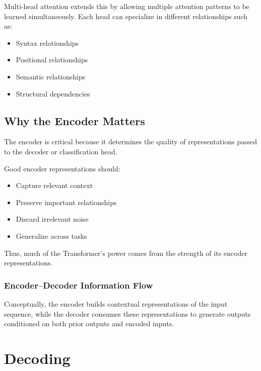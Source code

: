 \documentclass[11pt]{article}
\begin{document}
Multi-head attention extends this by allowing multiple attention patterns to be learned simultaneously. Each head can specialize in different relationships such as:

\begin{itemize}

\item Syntax relationships
\item Positional relationships
\item Semantic relationships
\item Structural dependencies

\end{itemize}

\subsection{Why the Encoder Matters}

The encoder is critical because it determines the quality of representations passed to the decoder or classification head.

Good encoder representations should:

\begin{itemize}

\item Capture relevant context
\item Preserve important relationships
\item Discard irrelevant noise
\item Generalize across tasks

\end{itemize}

Thus, much of the Transformer’s power comes from the strength of its encoder representations.


\subsubsection{Encoder–Decoder Information Flow}

Conceptually, the encoder builds contextual representations of the input sequence, while the decoder consumes these representations to generate outputs conditioned on both prior outputs and encoded inputs.


\section{Decoding}
\end{document}
